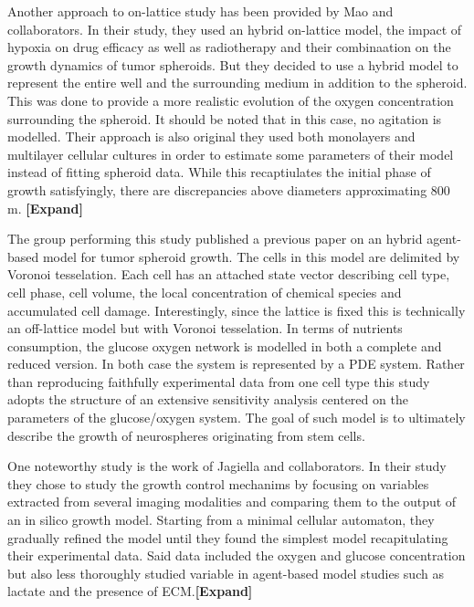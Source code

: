 \documentclass[11pt,a4paper]{article}
\begin{document}
Another approach to on-lattice study has been provided by Mao and collaborators.\cite{Mao2018} In their study, they used an hybrid on-lattice model, the impact of hypoxia on drug efficacy as well as radiotherapy and their combinaation on the growth dynamics of tumor spheroids. But they decided to use a hybrid model to represent the entire well and the surrounding medium in addition to the spheroid. This was done to provide a more realistic evolution of the oxygen concentration surrounding the spheroid. It should be noted that in this case, no agitation is modelled. Their approach is also original they used both monolayers and multilayer cellular cultures in order to estimate some parameters of their model instead of fitting spheroid data. While this recaptiulates the initial phase of growth satisfyingly, there are discrepancies above diameters approximating 800 \textmu m. \textbf{[Expand]}

The group performing this study published a previous paper on an hybrid agent-based model for tumor spheroid growth.\cite{Cleri2019} The cells in this model are delimited by Voronoi tesselation. Each cell has an attached state vector describing cell type, cell phase, cell volume, the local concentration of chemical species and accumulated cell damage. Interestingly, since the lattice is fixed this is technically an off-lattice model but with Voronoi tesselation. In terms of nutrients consumption, the glucose oxygen network is modelled in both a complete and reduced version. In both case the system is represented by a PDE system. Rather than reproducing faithfully experimental data from one cell type this study adopts the structure of an extensive sensitivity analysis centered on the parameters of the glucose/oxygen system. The goal of such model is to ultimately describe the growth of neurospheres originating from stem cells.

One noteworthy study is the work of Jagiella and collaborators.\cite{Jagiella2016} In their study they chose to study the growth control mechanims by focusing on variables extracted from several imaging modalities and comparing them to the output of an in silico growth model. Starting from a minimal cellular automaton, they gradually refined the model until they found the simplest model recapitulating their experimental data. Said data included the oxygen and glucose concentration but also less thoroughly studied variable in agent-based model studies such as lactate and the presence of ECM.\textbf{[Expand]} %
\end{document}
